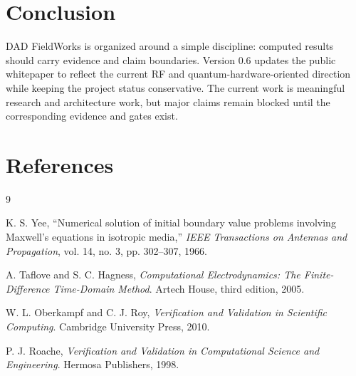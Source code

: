 \documentclass[11pt,a4paper]{article}
\begin{document}
\section{Conclusion}
\label{sec:conclusion}

DAD FieldWorks is organized around a simple discipline: computed results should carry evidence and claim boundaries. Version 0.6 updates the public whitepaper to reflect the current RF and quantum-hardware-oriented direction while keeping the project status conservative. The current work is meaningful research and architecture work, but major claims remain blocked until the corresponding evidence and gates exist.

\section{References}
\label{sec:references}

\begin{thebibliography}{9}

K. S. Yee,
``Numerical solution of initial boundary value problems involving Maxwell's equations in isotropic media,''
\emph{IEEE Transactions on Antennas and Propagation}, vol. 14, no. 3, pp. 302--307, 1966.

A. Taflove and S. C. Hagness,
\emph{Computational Electrodynamics: The Finite-Difference Time-Domain Method}.
Artech House, third edition, 2005.

W. L. Oberkampf and C. J. Roy,
\emph{Verification and Validation in Scientific Computing}.
Cambridge University Press, 2010.

P. J. Roache,
\emph{Verification and Validation in Computational Science and Engineering}.
Hermosa Publishers, 1998.

\end{thebibliography}
\end{document}
